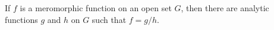 If $f$ is a meromorphic function on an open set $G$, then there are analytic functions $g$ and $h$ on $G$ such that $f = g/h$.
